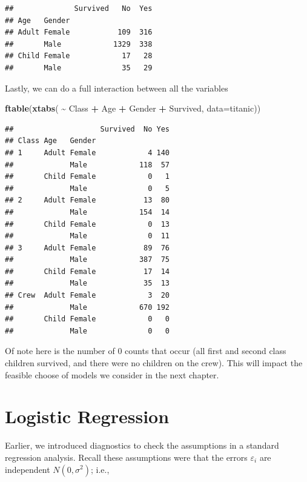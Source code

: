 \documentclass[
]{book}
\newenvironment{Shaded}{\begin{snugshade}}{\end{snugshade}}
\newcommand{\AttributeTok}[1]{\textcolor[rgb]{0.13,0.29,0.53}{#1}}
\newcommand{\FunctionTok}[1]{\textcolor[rgb]{0.13,0.29,0.53}{\textbf{#1}}}
\newcommand{\NormalTok}[1]{#1}
\newcommand{\SpecialCharTok}[1]{\textcolor[rgb]{0.81,0.36,0.00}{\textbf{#1}}}
\begin{document}
\begin{verbatim}
##              Survived   No  Yes
## Age   Gender                   
## Adult Female           109  316
##       Male            1329  338
## Child Female            17   28
##       Male              35   29
\end{verbatim}

Lastly, we can do a full interaction between all the variables

\begin{Shaded}
\begin{Highlighting}[]
\FunctionTok{ftable}\NormalTok{(}\FunctionTok{xtabs}\NormalTok{( }\SpecialCharTok{\textasciitilde{}}\NormalTok{ Class }\SpecialCharTok{+}\NormalTok{ Age }\SpecialCharTok{+}\NormalTok{ Gender }\SpecialCharTok{+}\NormalTok{ Survived, }\AttributeTok{data=}\NormalTok{titanic))}
\end{Highlighting}
\end{Shaded}

\begin{verbatim}
##                    Survived  No Yes
## Class Age   Gender                 
## 1     Adult Female            4 140
##             Male            118  57
##       Child Female            0   1
##             Male              0   5
## 2     Adult Female           13  80
##             Male            154  14
##       Child Female            0  13
##             Male              0  11
## 3     Adult Female           89  76
##             Male            387  75
##       Child Female           17  14
##             Male             35  13
## Crew  Adult Female            3  20
##             Male            670 192
##       Child Female            0   0
##             Male              0   0
\end{verbatim}

Of note here is the number of 0 counts that occur (all first and second class children survived, and there were no children on the crew). This will impact the feasible choose of models we consider in the next chapter.

\hypertarget{logistic-regression}{%
\chapter{Logistic Regression}\label{logistic-regression}}

Earlier, we introduced diagnostics to check the assumptions in a standard regression analysis. Recall these assumptions were that the errors \(\varepsilon_i\) are independent \(N(0, \sigma^2)\); i.e.,
\end{document}
